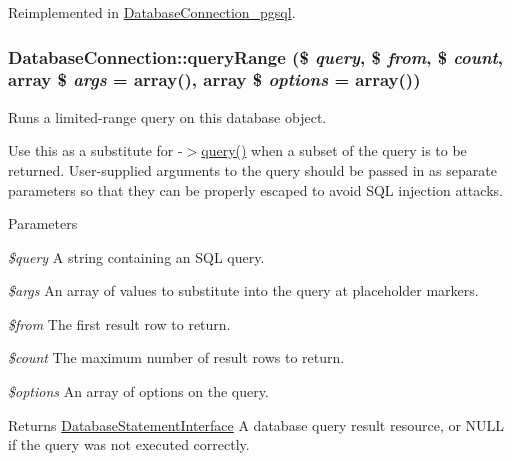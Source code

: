 Reimplemented in \hyperlink{classDatabaseConnection__pgsql_aa03d55a2837d71b3e832102447bc815f}{DatabaseConnection\_\-pgsql}.\hypertarget{classDatabaseConnection_a1c97c77517b969270bb92c5c7e022a5d}{
\subsubsection[{queryRange}]{\setlength{\rightskip}{0pt plus 5cm}DatabaseConnection::queryRange (\$ {\em query}, \/  \$ {\em from}, \/  \$ {\em count}, \/  array \$ {\em args} = {\ttfamily array()}, \/  array \$ {\em options} = {\ttfamily array()})}}
\label{classDatabaseConnection_a1c97c77517b969270bb92c5c7e022a5d}
Runs a limited-\/range query on this database object.

Use this as a substitute for -\/$>$\hyperlink{classDatabaseConnection_aff564097281c4496e9d10cb1bccbe98d}{query()} when a subset of the query is to be returned. User-\/supplied arguments to the query should be passed in as separate parameters so that they can be properly escaped to avoid SQL injection attacks.


\begin{DoxyParams}{Parameters}
\item[{\em \$query}]A string containing an SQL query. \item[{\em \$args}]An array of values to substitute into the query at placeholder markers. \item[{\em \$from}]The first result row to return. \item[{\em \$count}]The maximum number of result rows to return. \item[{\em \$options}]An array of options on the query.\end{DoxyParams}
\begin{DoxyReturn}{Returns}
\hyperlink{interfaceDatabaseStatementInterface}{DatabaseStatementInterface} A database query result resource, or NULL if the query was not executed correctly. 
\end{DoxyReturn}


